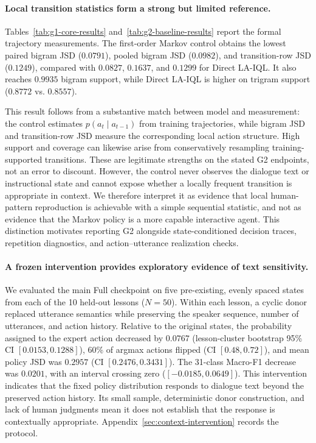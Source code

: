 \documentclass[manuscript,review,anonymous]{acmart}
\begin{document}
\paragraph{Local transition statistics form a strong but limited reference.}
Tables~\ref{tab:g1-core-results} and~\ref{tab:g2-baseline-results} report the
formal trajectory measurements. The first-order Markov control obtains the
lowest paired bigram JSD ($0.0791$), pooled bigram JSD ($0.0982$), and
transition-row JSD ($0.1249$), compared with $0.0827$, $0.1637$, and $0.1299$
for Direct LA-IQL. It also reaches $0.9935$ bigram support, while Direct
LA-IQL is higher on trigram support ($0.8772$ vs. $0.8557$).

This result follows from a substantive match between model and measurement:
the control estimates $p(a_t\mid a_{t-1})$ from training trajectories, while
bigram JSD and transition-row JSD measure the corresponding local action
structure. High support and coverage can likewise arise from conservatively
resampling training-supported transitions. These are legitimate strengths on
the stated G2 endpoints, not an error to discount. However, the control never
observes the dialogue text or instructional state and cannot expose whether a
locally frequent transition is appropriate in context. We therefore interpret
it as evidence that local human-pattern reproduction is achievable with a
simple sequential statistic, and not as evidence that the Markov policy is a
more capable interactive agent. This distinction motivates reporting G2
alongside state-conditioned decision traces, repetition diagnostics, and
action--utterance realization checks.

\paragraph{A frozen intervention provides exploratory evidence of text sensitivity.}
We evaluated the main Full checkpoint on five pre-existing, evenly spaced
states from each of the 10 held-out lessons ($N=50$). Within each lesson, a
cyclic donor replaced utterance semantics while preserving the speaker
sequence, number of utterances, and action history. Relative to the original
states, the probability assigned to the expert action decreased by $0.0767$
(lesson-cluster bootstrap 95\% CI $[0.0153,0.1288]$), 60\% of argmax actions
flipped (CI $[0.48,0.72]$), and mean policy JSD was $0.2957$ (CI
$[0.2476,0.3431]$). The 31-class Macro-F1 decrease was $0.0201$, with an
interval crossing zero ($[-0.0185,0.0649]$). This intervention indicates that
the fixed policy distribution responds to dialogue text beyond the preserved
action history. Its small sample, deterministic donor construction, and lack of
human judgments mean it does not establish that the response is contextually
appropriate. Appendix~\ref{sec:context-intervention} records the protocol.
\end{document}
